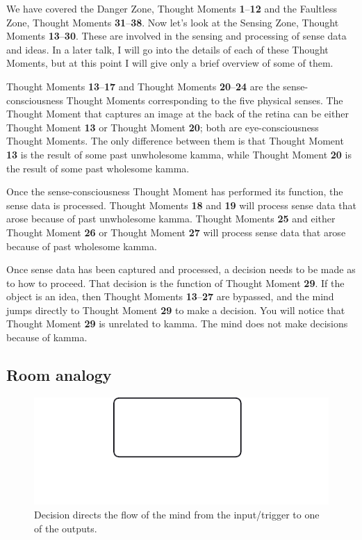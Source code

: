 We have covered the Danger Zone, Thought Moments \textbf{1}--\textbf{12} and the Faultless Zone, Thought Moments \textbf{31}--\textbf{38}. Now let’s look at the Sensing Zone, Thought Moments \textbf{13}--\textbf{30}. These are involved in the sensing and processing of sense data and ideas. In a later talk, I will go into the details of each of these Thought Moments, but at this point I will give only a brief overview of some of them.

Thought Moments \textbf{13}--\textbf{17} and Thought Moments \textbf{20}--\textbf{24} are the sense-consciousness Thought Moments corresponding to the five physical senses. The Thought Moment that captures an image at the back of the retina can be either Thought Moment \textbf{13} or Thought Moment \textbf{20}; both are eye-consciousness Thought Moments. The only difference between them is that Thought Moment \textbf{13} is the result of some past unwholesome kamma, while Thought Moment \textbf{20} is the result of some past wholesome kamma.

Once the sense-consciousness Thought Moment has performed its function, the sense data is processed. Thought Moments \textbf{18} and \textbf{19} will process sense data that arose because of past unwholesome kamma. Thought Moments \textbf{25} and either Thought Moment \textbf{26} or Thought Moment \textbf{27} will process sense data that arose because of past wholesome kamma.

Once sense data has been captured and processed, a decision needs to be made as to how to proceed. That decision is the function of Thought Moment \textbf{29}. If the object is an idea, then Thought Moments \textbf{13}--\textbf{27} are bypassed, and the mind jumps directly to Thought Moment \textbf{29} to make a decision. You will notice that Thought Moment \textbf{29} is unrelated to kamma. The mind does not make decisions because of kamma.

\subsection*{Room analogy}

\begin{figure}[h]
\centering
\includegraphics[width=0.4\linewidth]{./Diagrams/Room}
\caption{Decision directs the flow of the mind from the input/trigger to one of the outputs.}
\label{fig:Room}
\end{figure}

